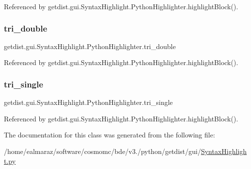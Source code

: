 Referenced by getdist.\+gui.\+Syntax\+Highlight.\+Python\+Highlighter.\+highlight\+Block().

\mbox{\label{classgetdist_1_1gui_1_1SyntaxHighlight_1_1PythonHighlighter_ae43352b566e021ec4e8354c69aa0ff2f}} 
\subsubsection{\texorpdfstring{tri\+\_\+double}{tri\_double}}
{\footnotesize\ttfamily getdist.\+gui.\+Syntax\+Highlight.\+Python\+Highlighter.\+tri\+\_\+double}



Referenced by getdist.\+gui.\+Syntax\+Highlight.\+Python\+Highlighter.\+highlight\+Block().

\mbox{\label{classgetdist_1_1gui_1_1SyntaxHighlight_1_1PythonHighlighter_a11be99684ea0153fae32e7df690d1e3f}} 
\subsubsection{\texorpdfstring{tri\+\_\+single}{tri\_single}}
{\footnotesize\ttfamily getdist.\+gui.\+Syntax\+Highlight.\+Python\+Highlighter.\+tri\+\_\+single}



Referenced by getdist.\+gui.\+Syntax\+Highlight.\+Python\+Highlighter.\+highlight\+Block().



The documentation for this class was generated from the following file\+:\begin{DoxyCompactItemize}
\item 
/home/ealmaraz/software/cosmomc/bde/v3./python/getdist/gui/\mbox{\hyperlink{SyntaxHighlight_8py}{Syntax\+Highlight.\+py}}\end{DoxyCompactItemize}
